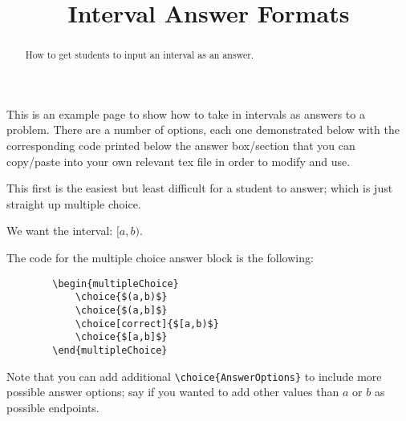 \documentclass{ximera}
\title{Interval Answer Formats}
\begin{document}
\begin{abstract}
How to get students to input an interval as an answer.
\end{abstract}
\maketitle

This is an example page to show how to take in intervals as answers to a problem. There are a number of options, each one demonstrated below with the corresponding code printed below the answer box/section that you can copy/paste into your own relevant tex file in order to modify and use.


\begin{problem}

    This first is the easiest but least difficult for a student to answer; which is just straight up multiple choice.
    
    We want the interval: $[a,b)$.
    
    \begin{multipleChoice}
        \choice{$(a,b]$}
        \choice[correct]{$[a,b)$}
        \choice{$[a,b]$}
    \end{multipleChoice}
    
    The code for the multiple choice answer block is the following:
    \begin{verbatim}
        \begin{multipleChoice}
            \choice{$(a,b)$}
            \choice{$(a,b]$}
            \choice[correct]{$[a,b)$}
            \choice{$[a,b]$}
        \end{multipleChoice}
    \end{verbatim}
    Note that you can add additional \verb|\choice{AnswerOptions}| to include more possible answer options; say if you wanted to add other values than $a$ or $b$ as possible endpoints.
\end{problem}
\end{document}

